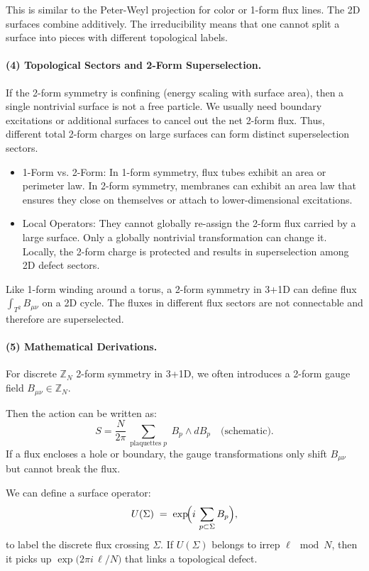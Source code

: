 \documentclass[12pt,a4paper]{article}
\begin{document}
This is similar to the Peter-Weyl projection for color or 1-form flux lines.
The 2D surfaces combine additively.
The irreducibility means that one cannot split a surface into pieces with different topological labels.


\paragraph{(4) Topological Sectors and 2-Form Superselection.}
If the 2-form symmetry is confining (energy scaling with surface area),
then a single nontrivial surface is not a free particle.
We usually need boundary excitations or additional surfaces to cancel out the net 2-form flux.
Thus, different total 2-form charges on large surfaces can form distinct superselection sectors.
\begin{itemize}
	\item 1-Form vs. 2-Form:  
	In 1-form symmetry, flux tubes \cite{Bali1995,Bali2001} exhibit an area or perimeter law.
	In 2-form symmetry, membranes can exhibit an area law that ensures they close on themselves or attach to lower-dimensional excitations.  
	
	\item Local Operators:  
	They cannot globally re-assign the 2-form flux carried by a large surface.
	Only a globally nontrivial transformation can change it.
	Locally, the 2-form charge is protected and results in superselection among 2D defect sectors.
\end{itemize}


Like 1-form winding around a torus, a 2-form symmetry in 3+1D can define flux $\int_{T^2} B_{\mu\nu}$ on a 2D cycle.
The fluxes in different flux sectors are not connectable and therefore are superselected.


\paragraph{(5) Mathematical Derivations.}
For discrete $\mathbb{Z}_N$ 2-form symmetry in 3+1D, we often introduces a 2-form gauge field $B_{\mu\nu}\in \mathbb{Z}_N$.

Then the action can be written as:  
\[
S = \frac{N}{2\pi}\,\sum_{\text{plaquettes }p}\; B_p \wedge d B_p 
\quad\text{(schematic)}.
\]
If a flux encloses a hole or boundary, the gauge transformations only shift $B_{\mu\nu}$ but cannot break the flux.


We can define a surface operator:  
\[
U(\Sigma) 
\;=\;
\exp\!\Bigl(i \,\sum_{p\subset \Sigma} B_p\Bigr),
\]
to label the discrete flux crossing $\Sigma$.
If $U(\Sigma)$ belongs to irrep $\ell\mod N$, then it picks up $\exp\bigl(2\pi i \,\ell / N\bigr)$ that links a topological defect.
\end{document}
